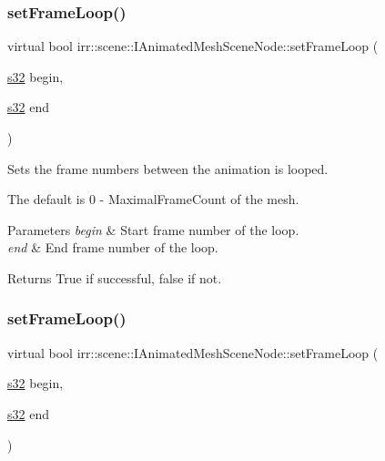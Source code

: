 \subsubsection{\texorpdfstring{set\+Frame\+Loop()}{setFrameLoop()}\hspace{0.1cm}{\footnotesize\ttfamily [1/2]}}
{\footnotesize\ttfamily virtual bool irr\+::scene\+::\+I\+Animated\+Mesh\+Scene\+Node\+::set\+Frame\+Loop (\begin{DoxyParamCaption}\item[{\hyperlink{namespaceirr_ac66849b7a6ed16e30ebede579f9b47c6}{s32}}]{begin,  }\item[{\hyperlink{namespaceirr_ac66849b7a6ed16e30ebede579f9b47c6}{s32}}]{end }\end{DoxyParamCaption})\hspace{0.3cm}{\ttfamily [pure virtual]}}



Sets the frame numbers between the animation is looped. 

The default is 0 -\/ Maximal\+Frame\+Count of the mesh. 
\begin{DoxyParams}{Parameters}
{\em begin} & Start frame number of the loop. \\
\hline
{\em end} & End frame number of the loop. \\
\hline
\end{DoxyParams}
\begin{DoxyReturn}{Returns}
True if successful, false if not. 
\end{DoxyReturn}
\mbox{\label{classirr_1_1scene_1_1IAnimatedMeshSceneNode_a900400fe375ca13f48876b84900ffddf}} 
\subsubsection{\texorpdfstring{set\+Frame\+Loop()}{setFrameLoop()}\hspace{0.1cm}{\footnotesize\ttfamily [2/2]}}
{\footnotesize\ttfamily virtual bool irr\+::scene\+::\+I\+Animated\+Mesh\+Scene\+Node\+::set\+Frame\+Loop (\begin{DoxyParamCaption}\item[{\hyperlink{namespaceirr_ac66849b7a6ed16e30ebede579f9b47c6}{s32}}]{begin,  }\item[{\hyperlink{namespaceirr_ac66849b7a6ed16e30ebede579f9b47c6}{s32}}]{end }\end{DoxyParamCaption})\hspace{0.3cm}{\ttfamily [pure virtual]}}



